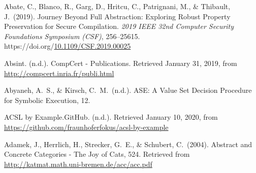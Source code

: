 \documentclass[12pt,twoside]{article}
\begin{document}
{\begin{thebibliography}{1079}
\mdbibitemlabel{}Abate, C., Blanco, R., Garg, D., Hritcu, C., Patrignani, M., \& Thibault, J.~(2019). Journey Beyond Full Abstraction: Exploring Robust Property Preservation for Secure Compilation. \emph{2019 IEEE 32nd Computer Security Foundations Symposium (CSF)}, 256–25615. https://doi.org/\href{https://dx.doi.org/10.1109/CSF.2019.00025}{10.1109/CSF.2019.00025}%

\mdbibitemlabel{}Absint. (n.d.). CompCert - Publications. Retrieved January 31, 2019, from \href{http://compcert.inria.fr/publi.html}{{\ttfamily http://\hspace{0pt}compcert.\hspace{0pt}inria.\hspace{0pt}fr/\hspace{0pt}publi.\hspace{0pt}html}}%

\mdbibitemlabel{}Abyaneh, A.~S., \& Kirsch, C.~M.~(n.d.). ASE: A Value Set Decision Procedure for Symbolic Execution, 12.%

\mdbibitemlabel{}ACSL by Example.GitHub. (n.d.). Retrieved January 10, 2020, from \href{https://github.com/fraunhoferfokus/acsl-by-example}{{\ttfamily https://\hspace{0pt}github.\hspace{0pt}com/\hspace{0pt}fraunhoferfokus/\hspace{0pt}acsl-\hspace{0pt}by-\hspace{0pt}example}}%

\mdbibitemlabel{}Adamek, J., Herrlich, H., Strecker, G.~E., \& Schubert, C.~(2004). Abstract and Concrete Categories - The Joy of Cats, 524. Retrieved from \href{http://katmat.math.uni-bremen.de/acc/acc.pdf}{{\ttfamily http://\hspace{0pt}katmat.\hspace{0pt}math.\hspace{0pt}uni-\hspace{0pt}bremen.\hspace{0pt}de/\hspace{0pt}acc/\hspace{0pt}acc.\hspace{0pt}pdf}}%


\end{thebibliography}}
\end{document}
